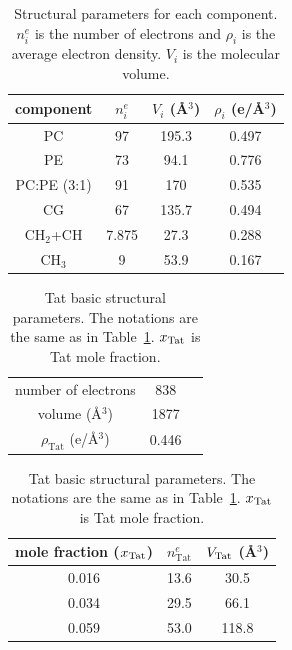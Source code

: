 \begin{table}[htbp]
  \centering
  \begin{tabular}{cccc}
    \hline
    component & $n^e_i$ & $V_i$ (\AA$^3$) & $\rho_i$ (e/\AA$^3$) \\
    \hline 
    PC & 97 & 195.3 & 0.497 \\  
    PE & 73 & 94.1  & 0.776 \\
    PC:PE (3:1) & 91 & 170 & 0.535 \\
    CG & 67 & 135.7 & 0.494 \\  
    CH$_2$+CH & 7.875 & 27.3 & 0.288 \\
    CH$_3$ & 9 & 53.9 & 0.167 \\
    \hline
  \end{tabular}
  \caption[Structural parameters for each component]
  {Structural parameters for each component. 
  $n^e_i$ is the number of electrons and
  $\rho_i$ is the average electron density.
  $V_i$ is the molecular volume.
  }
  \label{tab:component}
\end{table}

\begin{table}[htbp]
  \centering
  \begin{tabular}{c c c}
    \hline
    number of electrons & 838 \\ 
    volume (\AA$^3$) & 1877 \\
    $\rho_\textrm{Tat}$ (e/\AA$^3$) & 0.446 \\
    \hline
  \end{tabular}
  \quad
  \begin{tabular}{ ccc }
    \hline
    mole fraction ($x_\textrm{Tat}$) & $n^e_\textrm{Tat}$ & $V_\textrm{Tat}$ (\AA$^3$) \\    
    \hline
    0.016 & 13.6 & 30.5 \\
    0.034 & 29.5 & 66.1 \\
    0.059 & 53.0 & 118.8 \\
    \hline
  \end{tabular}
  \caption[Tat basic structural parameters]
  {Tat basic structural parameters. The notations are the same
  as in Table~\ref{tab:component}. $x_\textrm{Tat}$ is Tat mole fraction.}
  \label{tab:Tat_basic_params}
\end{table}

